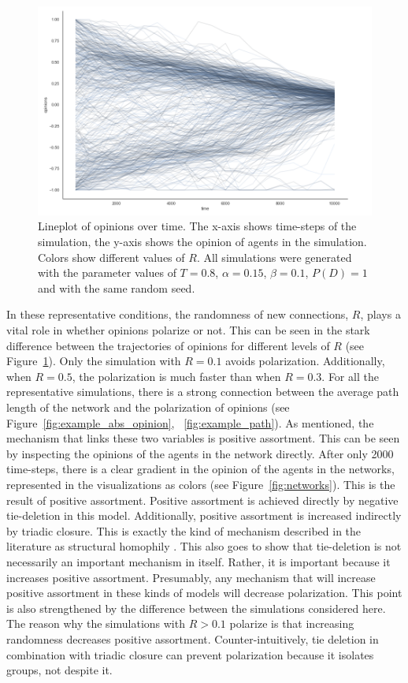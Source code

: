\documentclass[11pt]{article}
\begin{document}
\begin{figure}[H]
    \centering
    \includegraphics[width=.8\linewidth]{../plots/example/Lineplot_Over_Time.png}
  \caption{Lineplot of opinions over time. The x-axis shows time-steps of the simulation, the y-axis shows the opinion of agents in the simulation. Colors show different values of $R$. All simulations were generated with the parameter values of $T = 0.8$, $\alpha = 0.15$, $\beta = 0.1$, $P(D) = 1$ and with the same random seed.}
  \label{fig:lineplot}
\end{figure}

\noindent In these representative conditions, the randomness of new connections, $R$, plays a vital role in whether opinions polarize or not. This can be seen in the stark difference between the trajectories of opinions for different levels of $R$ (see Figure~\ref{fig:lineplot}). Only the simulation with $R=0.1$ avoids polarization. Additionally, when $R=0.5$, the polarization is much faster than when $R=0.3$. For all the representative simulations, there is a strong connection between the average path length of the network and the polarization of opinions (see Figure~\ref{fig:example_abs_opinion}, ~\ref{fig:example_path}). As mentioned, the mechanism that links these two variables is positive assortment. This can be seen by inspecting the opinions of the agents in the network directly. After only 2000 time-steps, there is a clear gradient in the opinion of the agents in the networks, represented in the visualizations as colors (see Figure~\ref{fig:networks}). This is the result of positive assortment. Positive assortment is achieved directly by negative tie-deletion in this model. Additionally, positive assortment is increased indirectly by triadic closure. This is exactly the kind of mechanism described in the literature as structural homophily \cite{asikainen_cumulative_2020,peixoto_disentangling_2022}. This also goes to show that tie-deletion is not necessarily an important mechanism in itself. Rather, it is important because it increases positive assortment. Presumably, any mechanism that will increase positive assortment in these kinds of models will decrease polarization. This point is also strengthened by the difference between the simulations considered here. The reason why the simulations with $R > 0.1$ polarize is that increasing randomness decreases positive assortment. Counter-intuitively, tie deletion in combination with triadic closure can prevent polarization because it isolates groups, not despite it. 
\end{document}
